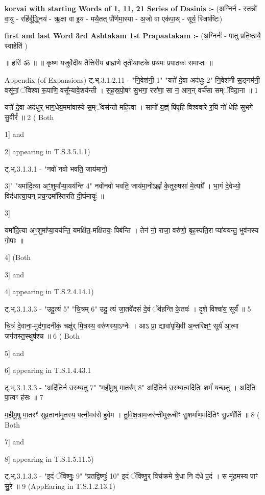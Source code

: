 \documentclass[17pt]{extarticle}
\begin{document}
{{        \textbf{korvai with starting Words of 1, 11, 21 Series of Dasinis :-} \newline
        (अ॒ग्निर्न॒ - स्तन्नो॑ वा॒यु - रहि॑र्बू॒द्ध्निय॑ - ऋ॒क्षा वा इ॒य - मथै॒तत् पौ᳚र्णमा॒स्या - अ॒जो वा एक॑पा॒थ् - सूर्य॒ स्त्रिष॑ष्टिः) \newline

        \textbf{first and last  Word 3rd Ashtakam 1st Prapaatakam :-} \newline
        (अ॒ग्निर्नः॑ - पातु प्रति॒ष्ठायै॒ स्वाहेति॑ ) \newline 

       

        ॥ हरिः॑ ॐ ॥
॥ कृष्ण यजुर्वेदीय तैत्तिरीय ब्राह्मणे तृतीयाष्टके प्रथमः प्रपाठकः समाप्तः ॥

Appendix (of Expansions)
ट्.भ्.3.1.2.11 - "नि॒वेश॑नी॒ {1}" "यत्ते॑ दे॒वा अद॑धुः {2}"
नि॒वेश॑नी स॒ङ्गम॑नी॒ वसू॑नां॒ ॅविश्वा॑ रू॒पाणि॒ वसू᳚न्यावे॒शय॑न्ती । 
स॒ह॒स्र॒पो॒षꣳ सु॒भगा॒ ररा॑णा॒ सा न॒ आग॒न् वर्च॑सा सम्ॅविदा॒ना ॥ {1}

यत्ते॑ दे॒वा अद॑धुर् भाग॒धेय॒ममा॑वास्ये स॒म्ॅवस॑न्तो महि॒त्वा । 
सानो॑ य॒ज्ञ्ं पि॑पृहि विश्ववारे र॒यिं नो॑ धेहि सुभगे सु॒वीरं᳚ ॥ {2}
( Both {1] and {2] appearing in T.S.3.5.1.1) 

ट्.भ्.3.1.3.1 - "नवो॑ नवो भवति॒ जाय॑मानो॒ {3]" 
"यमा॑दि॒त्या अꣳ॒॒शुमा᳚प्या॒यय॑न्ति {4}" 
नवो॑नवो भवति॒ जाय॑मा॒नोऽह्नां᳚ के॒तुरु॒षसा॑ मे॒त्यग्रे᳚ । 
भा॒गं दे॒वेभ्यो॒ विद॑धात्या॒यन् प्रच॒न्द्रमा᳚स्तिरति दी॒र्घमायुः॑ ॥ {3]

यमा॑दि॒त्या अꣳ॒॒शुमा᳚प्या॒यय॑न्ति॒ यमक्षि॑त॒-मक्षि॑तयः॒ पिब॑न्ति । 
तेन॑ नो॒ राजा॒ वरु॑णो॒ बृह॒स्पति॒रा प्या॑ययन्तु॒ भुव॑नस्य गो॒पाः ॥ {4]
(Both {3] and {4] appearing in T.S.2.4.14.1)

ट्.भ्.3.1.3.3 - "उदु॒त्यं {5}" "चि॒त्रम् {6}" 
उदु॒ त्यं जा॒तवे॑दसं दे॒वं ॅव॑हन्ति के॒तवः॑ । दृ॒शे विश्वा॑य॒ सूर्यं᳚ ॥ {5}

चि॒त्रं दे॒वाना॒-मुद॑गा॒दनी॑कं॒ चक्षु॑र् मि॒त्रस्य॒ वरु॑णस्या॒ऽग्नेः । 
आऽ प्रा॒ द्यावा॑पृथि॒वी अ॒न्तरि॑क्षꣳ॒॒ सूर्य॑ आ॒त्मा जग॑तस्त॒स्थुष॑श्च ॥ {6}
( Both {5] and {6] appearing in T.S.1.4.43.1

ट्.भ्.3.1.3.3 - "अदि॑तिर्न उरुष्य॒तु {7}" "म॒हीमू॒षु मा॒तर᳚म् {8}" 
अदि॑तिर्न उरुष्य॒त्वदि॑तिः॒ शर्म॑ यच्छतु । अदि॑तिः पा॒त्वꣳ ह॑सः ॥ {7}

म॒हीमू॒षु मा॒तरꣳ॑ सुव्र॒ताना॑मृ॒तस्य॒ पत्नी॒मव॑से हुवेम । 
तु॒वि॒क्ष॒त्राम॒जर॑न्तीमुरू॒चीꣳ सु॒शर्मा॑ण॒मदि॑तिꣳ सु॒प्रणी॑तिं ॥ {8}
( Both {7] and {8] appearing in T.S.1.5.11.5) 

ट्.भ्.3.1.3.3 - "इ॒दं ॅविष्णुः॒ {9}" "प्रतद्विष्णुः॑ {10}" 
इ॒दं ॅविष्णु॒र् विच॑क्रमे त्रे॒धा नि द॑धे प॒दं । 
स मू॑ढमस्य पाꣳ सु॒॒रे ॥ {9} 
(AppEaring in T.S.1.2.13.1)

}}}}}}}}}}}}}
\end{document}

